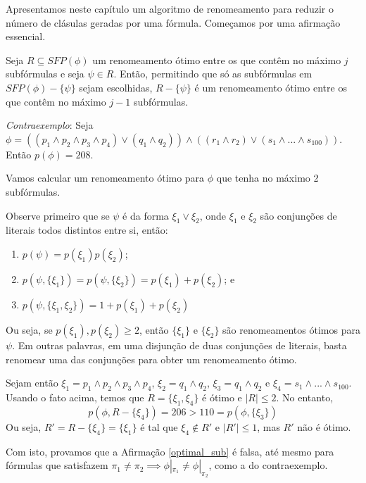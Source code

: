 
\label{cap_algoritmo}

\indent

Apresentamos neste capítulo um algoritmo de renomeamento para reduzir o número de clásulas geradas por uma fórmula. Começamos por uma afirmação essencial.

\begin{affirmation}
	\label{optimal_sub}
	Seja $R \subseteq SFP(\phi)$ um renomeamento ótimo entre os que contêm no máximo $j$ subfórmulas e seja $\psi \in R$. Então, permitindo que só as subfórmulas em $SFP(\phi) - \{\psi \}$ sejam escolhidas, $R - \{\psi\}$ é um renomeamento ótimo entre os que contêm no máximo $j-1$ subfórmulas.
\end{affirmation}

\emph{Contraexemplo}: Seja $\phi = ((p_1 \wedge p_2 \wedge p_3 \wedge p_4) \vee (q_1 \wedge q_2)) \wedge ((r_1 \wedge r_2) \vee (s_1 \wedge ... \wedge s_{100}))$. Então $p(\phi) = 208$.

Vamos calcular um renomeamento ótimo para $\phi$ que tenha no máximo 2 subfórmulas.

Observe primeiro que se $\psi$ é da forma $\xi_1 \vee \xi_2$, onde $\xi_1$ e $\xi_2$ são conjunções de literais todos distintos entre si, então:
\begin{enumerate}
	\item $p(\psi) = p(\xi_1)p(\xi_2)$;
	\item $p(\psi, \{\xi_1 \}) = p(\psi, \{\xi_2 \}) = p(\xi_1)+p(\xi_2)$; e
	\item $p(\psi,\{\xi_1,\xi_2 \}) = 1+p(\xi_1)+p(\xi_2)$
\end{enumerate}
Ou seja, se $p(\xi_1),p(\xi_2) \geq 2$, então $\{\xi_1 \}$ e $\{\xi_2 \}$ são renomeamentos ótimos para $\psi$. Em outras palavras, em uma disjunção de duas conjunções de literais, basta renomear uma das conjunções para obter um renomeamento ótimo.

Sejam então $\xi_1 = p_1 \wedge p_2 \wedge p_3 \wedge p_4$, $\xi_2 = q_1 \wedge q_2$, $\xi_3 = q_1 \wedge q_2$ e $\xi_4 = s_1 \wedge ... \wedge s_{100}$. Usando o fato acima, temos que $R = \{\xi_1,\xi_4 \}$ é ótimo e $|R| \leq 2$. No entanto, $$p(\phi,R - \{\xi_4 \}) = 206 > 110 = p(\phi,\{\xi_3 \})$$ Ou seja, $R' = R - \{\xi_4 \} = \{\xi_1 \}$ é tal que $\xi_4 \notin R'$ e $|R'| \leq 1$, mas $R'$ não é ótimo.

Com isto, provamos que a Afirmação \ref{optimal_sub} é falsa, até mesmo para fórmulas que satisfazem $\pi_1 \neq \pi_2 \implies \phi|_{\pi_1} \neq \phi|_{\pi_2}$, como a do contraexemplo.

